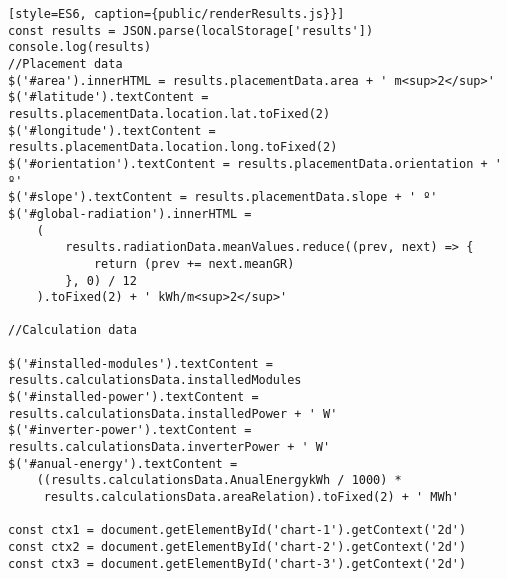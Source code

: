 \begin{lstlisting}[style=ES6, caption={public/renderResults.js}}]
const results = JSON.parse(localStorage['results'])
console.log(results)
//Placement data
$('#area').innerHTML = results.placementData.area + ' m<sup>2</sup>'
$('#latitude').textContent = results.placementData.location.lat.toFixed(2)
$('#longitude').textContent = results.placementData.location.long.toFixed(2)
$('#orientation').textContent = results.placementData.orientation + ' º'
$('#slope').textContent = results.placementData.slope + ' º'
$('#global-radiation').innerHTML =
	(
		results.radiationData.meanValues.reduce((prev, next) => {
			return (prev += next.meanGR)
		}, 0) / 12
	).toFixed(2) + ' kWh/m<sup>2</sup>'

//Calculation data

$('#installed-modules').textContent = results.calculationsData.installedModules
$('#installed-power').textContent = results.calculationsData.installedPower + ' W'
$('#inverter-power').textContent = results.calculationsData.inverterPower + ' W'
$('#anual-energy').textContent =
	((results.calculationsData.AnualEnergykWh / 1000) *
	 results.calculationsData.areaRelation).toFixed(2) + ' MWh'

const ctx1 = document.getElementById('chart-1').getContext('2d')
const ctx2 = document.getElementById('chart-2').getContext('2d')
const ctx3 = document.getElementById('chart-3').getContext('2d')


\end{lstlisting}
